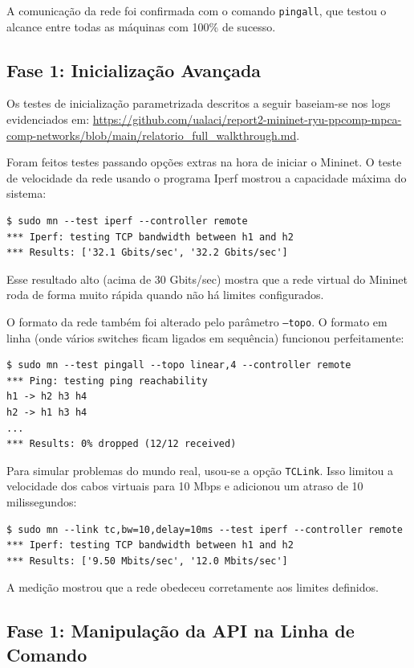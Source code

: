 \documentclass[12pt,a4paper]{article}
\begin{document}
A comunicação da rede foi confirmada com o comando \texttt{pingall}, que testou o alcance entre todas as máquinas com 100\% de sucesso.

\subsection{Fase 1: Inicialização Avançada}

Os testes de inicialização parametrizada descritos a seguir baseiam-se nos logs evidenciados em: \url{https://github.com/ualaci/report2-mininet-ryu-ppcomp-mpca-comp-networks/blob/main/relatorio_full_walkthrough.md}.

Foram feitos testes passando opções extras na hora de iniciar o Mininet. O teste de velocidade da rede usando o programa Iperf mostrou a capacidade máxima do sistema:

\begin{lstlisting}
$ sudo mn --test iperf --controller remote
*** Iperf: testing TCP bandwidth between h1 and h2 
*** Results: ['32.1 Gbits/sec', '32.2 Gbits/sec']
\end{lstlisting}
Esse resultado alto (acima de 30 Gbits/sec) mostra que a rede virtual do Mininet roda de forma muito rápida quando não há limites configurados.

O formato da rede também foi alterado pelo parâmetro \texttt{--topo}. O formato em linha (onde vários switches ficam ligados em sequência) funcionou perfeitamente:

\begin{lstlisting}
$ sudo mn --test pingall --topo linear,4 --controller remote
*** Ping: testing ping reachability
h1 -> h2 h3 h4 
h2 -> h1 h3 h4 
...
*** Results: 0% dropped (12/12 received)
\end{lstlisting}

Para simular problemas do mundo real, usou-se a opção \texttt{TCLink}. Isso limitou a velocidade dos cabos virtuais para 10 Mbps e adicionou um atraso de 10 milissegundos:

\begin{lstlisting}
$ sudo mn --link tc,bw=10,delay=10ms --test iperf --controller remote
*** Iperf: testing TCP bandwidth between h1 and h2 
*** Results: ['9.50 Mbits/sec', '12.0 Mbits/sec']
\end{lstlisting}
A medição mostrou que a rede obedeceu corretamente aos limites definidos.

\subsection{Fase 1: Manipulação da API na Linha de Comando}
\end{document}
